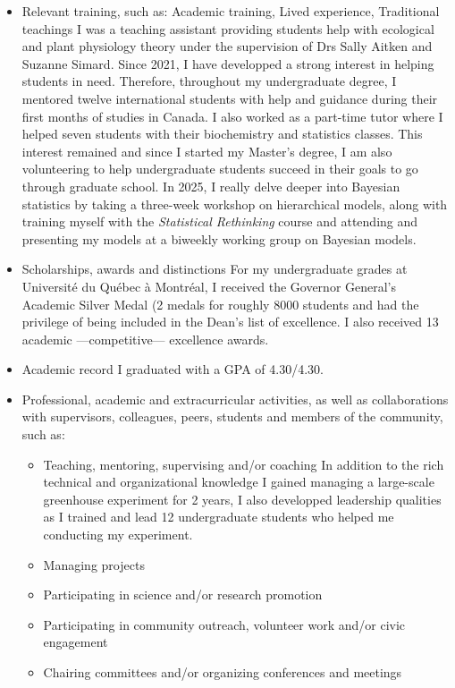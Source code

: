 \documentclass{article}
\begin{document}
\begin{itemize}
    \item Relevant training, such as: Academic training, Lived experience, Traditional teachings
I was a teaching assistant providing students help with ecological and plant physiology theory under the supervision of Drs Sally Aitken and Suzanne Simard. Since 2021, I have developped a strong interest in helping students in need. Therefore, throughout my undergraduate degree, I mentored twelve international students with help and guidance during their first months of studies in Canada. I also worked as a part-time tutor where I helped seven students with their biochemistry and statistics classes. This interest remained and since I started my Master's degree, I am also volunteering to help undergraduate students succeed in their goals to go through graduate school.
In 2025, I really delve deeper into Bayesian statistics by taking a three-week workshop on hierarchical models, along with training myself with the \textit{Statistical Rethinking} course and attending and presenting my models at a biweekly working group on Bayesian models. 
    \item Scholarships, awards and distinctions
For my undergraduate grades at Université du Québec à Montréal, I received the Governor General's Academic Silver Medal (2 medals for roughly 8000 students and had the privilege of being included in the Dean's list of excellence. I also received 13 academic ---competitive--- excellence awards.
    \item Academic record
I graduated with a GPA of 4.30/4.30.
    \item Professional, academic and extracurricular activities, as well as collaborations with supervisors, colleagues, peers, students and members of the community, such as:
    \begin{itemize}
        \item Teaching, mentoring, supervising and/or coaching
         In addition to the rich technical and organizational knowledge I gained managing a large-scale greenhouse experiment for 2 years, I also developped leadership qualities as I trained and lead 12 undergraduate students who helped me conducting my experiment.
        \item Managing projects
        \item Participating in science and/or research promotion
        \item Participating in community outreach, volunteer work and/or civic engagement
        \item Chairing committees and/or organizing conferences and meetings

\end{itemize}
\end{itemize}
\end{document}
